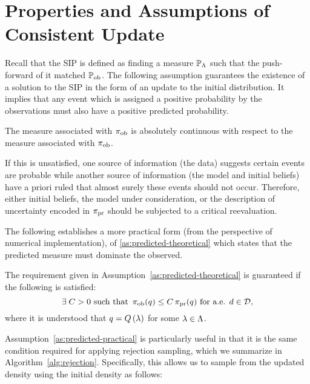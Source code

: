 \section{Properties and Assumptions of Consistent Update}\label{sec:properties}
Recall that the SIP is defined as finding a measure $\mathbb{P}_{\Lambda}$ such that the push-forward of it matched $\operatorname*{\mathbb{P}_{ob}}$.
The following assumption guarantees the existence of a solution to the SIP in the form of an update to the initial distribution.
It implies that any event which is assigned a positive probability by the observations must also have a positive predicted probability.

\begin{assumption}\label{as:predicted-theoretical}
  The measure associated with $\operatorname*{\pi_{ob}}$ is absolutely continuous with respect to the measure associated with $\operatorname*{\pi_{ob}}$.
\end{assumption}

If this is unsatisfied, one source of information (the data) suggests certain events are probable while another source of information (the model and initial beliefs) have a priori ruled that almost surely these events should not occur.
Therefore, either initial beliefs, the model under consideration, or the description of uncertainty encoded in $\operatorname*{\pi_{pr}}$ should be subjected to a critical reevaluation.

The following establishes a more practical form (from the perspective of numerical implementation), of \ref{as:predicted-theoretical} which states that the predicted measure must dominate the observed.
\begin{assumption}\label{as:predicted-practical}
The requirement given in Assumption~\ref{as:predicted-theoretical} is guaranteed if the following is satisfied:
\begin{equation}\label{eq:pred-pract}
  \exists \; C>0 \text{ such that } \operatorname*{\pi_{ob}} (q) \leq C \operatorname*{\pi_{pr}}(q) \text{ for a.e. } d\in \mathcal{D},
\end{equation}
where it is understood that $q = Q\left ( \lambda \right )$ for some $\lambda \in {\Lambda}$.
\end{assumption}

Assumption~\ref{as:predicted-practical} is particularly useful in that it is the same condition required for applying rejection sampling, which we summarize in Algorithm~\ref{alg:rejection}.
Specifically, this allows us to sample from the updated density using the initial density as follows:

